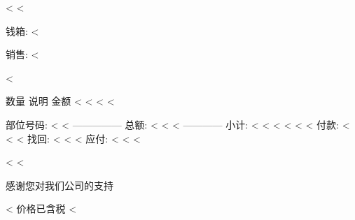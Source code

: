 <%
<%

 钱箱: <%

销售: <%

<%

  数量 说明                 金额
<%
<%
      <%
<%

部位号码: <%
<%
                         ---------------
                        总额: <%
<%
<%
                            ------------
                     小计: <%
<%
<%
<%
<%
<%
                         付款: <%
<%
<%
                       找回: <%
<%
<%
                  应付: <%
<%
<%

<%
<%

   感谢您对我们公司的支持

<%
价格已含税
<%
